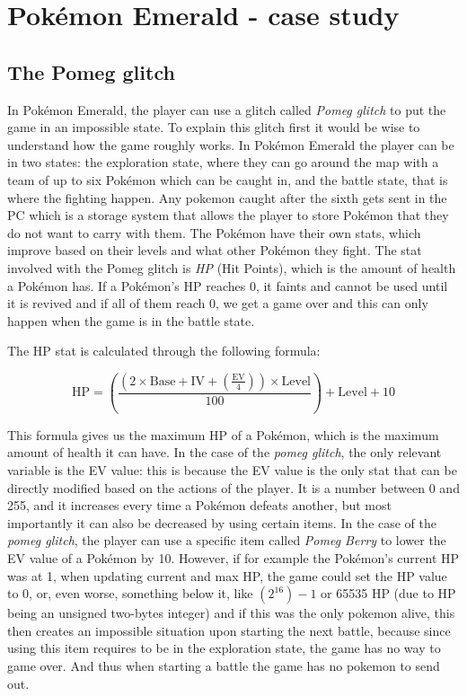 \documentclass[a4paper]{usiinfbachelorproject}
\begin{document}
\section{\textbf{Pokémon Emerald - case study}}
\subsection{\textbf{The Pomeg glitch}}
In Pokémon Emerald, the player can use a glitch called \textit{Pomeg glitch} to put the game in an impossible state. To explain this glitch first it would be wise to understand how the game roughly works. In Pokémon Emerald the player can be in two states: the exploration state, where they can go around the map with a team of up to six Pokémon which can be caught in, and the battle state, that is where the fighting happen. Any pokemon caught after the sixth gets sent in the PC which is a storage system that allows the player to store Pokémon that they do not want to carry with them. The Pokémon have their own stats, which improve based on their levels and what other Pokémon they fight. The stat involved with the Pomeg glitch is \textit{HP} (Hit Points), which is the amount of health a Pokémon has. If a Pokémon's HP reaches 0, it faints and cannot be used until it is revived and if all of them reach 0, we get a game over and this can only happen when the game is in the battle state.

The HP stat is calculated through the following formula:

\begin{equation}
	\text{HP} = \left( \frac{(2 \times \text{Base} + \text{IV} + \left( \frac{\text{EV}}{4} \right)) \times \text{Level}}{100} \right) + \text{Level} + 10
	\label{eq:ergodic_hypothesis}
\end{equation}

This formula gives us the maximum HP of a Pokémon, which is the maximum amount of health it can have. In the case of the \textit{pomeg glitch}, the only relevant variable is the EV value: this is because the EV value is the only stat that can be directly modified based on the actions of the player. It is a number between 0 and 255, and it increases every time a Pokémon defeats another, but most importantly it can also be decreased by using certain items. In the case of the \textit{pomeg glitch}, the player can use a specific item called \textit{Pomeg Berry} to lower the EV value of a Pokémon by 10. However, if for example the Pokémon's current HP was at 1, when updating current and max HP, the game could set the HP value to 0, or, even worse, something below it, like $ (2^16)-1$ or 65535 HP (due to HP being an unsigned two-bytes integer) and if this was the only pokemon alive, this then creates an impossible situation upon starting the next battle, because since using this item requires to be in the exploration state, the game has no way to game over. And thus when starting a battle the game has no pokemon to send out.
\end{document}

